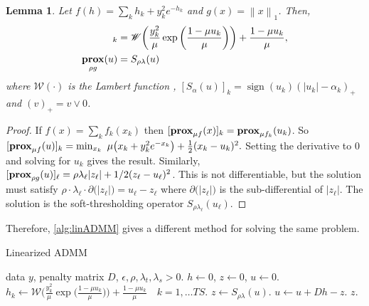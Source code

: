 \documentclass{article}
\newtheorem{lemma}[theorem]{Lemma}
\newcommand{\norm}[1]{\left\lVert #1 \right\rVert}
\DeclareMathOperator*{\prox}{\bf prox}
\DeclareMathOperator*{\sign}{sign}
\begin{document}
\begin{lemma}
  Let $f(h) = \sum_{k} h_{k} + y_{k}^2e^{-h_{k}}$ and $g(x) =
  \norm{x}_1$. Then, 
  \begin{align}
    [\prox_{\mu f}(u)]_k &= \mathscr{W}\bigg(\frac{y_k^2}{\mu}
    \exp\bigg(\frac{1-\mu u_k}{\mu}\bigg) \bigg) + \frac{1-\mu u_k}{\mu},\\
    \prox_{\rho g}(u) &= S_{\rho\lambda}(u)
  \end{align}
where $\mathscr{W}(\cdot)$ is the \textit{Lambert function} \cite{corless_lambertw_1996},  $[S_{\alpha}(u)]_k = \sign(u_k)(|u_k| -\alpha_k)_+$ and
$(v)_+=v\vee 0$.
\end{lemma}
\begin{proof}
  If $f(x)=\sum_k f_k(x_k)$ then $[\prox_{\mu f}(x)]_k =
  \prox_{\mu f_k}(u_k)$. So 
  $[\prox_{\mu f}(u)]_k=\min_{x_k} \,\,
  \mu\big(x_k+y_{k}^2e^{-x_{k}}\big)+\frac{1}{2}  (x_k-u_k)^2.$
  Setting the derivative to 0 and solving for $u_k$ gives the
  result. Similarly, $[\prox_{\rho g}(u)]_\ell=\rho
  \lambda_\ell |z_\ell|+1/2(z_\ell-u_\ell)^2$. This is not differentiable,
  but the solution must satisfy $\rho \cdot \lambda_\ell \cdot \partial
  \big(|z_\ell| \big)=u_\ell-z_\ell$ where $\partial \big(|z_\ell| \big)$ is the
  sub-differential of $|z_\ell|$. The solution is the soft-thresholding
  operator $S_{\rho\lambda_\ell}(u_\ell)$.
\end{proof}

Therefore, \autoref{alg:linADMM} gives a different method for solving
the same problem.

\begin{algorithm}[tb]
  \caption{Linearized ADMM }
  \label{alg:linADMM}
  \begin{algorithmic}
     data $y$, penalty matrix $D$, 
    $\epsilon, \rho,\lambda_t,\lambda_s >0$.
     $h\leftarrow 0$, $z\leftarrow 0$, $u\leftarrow
    0$.  
    \REPEAT
    \STATE $h_k\leftarrow \mathscr{W}\bigg(\frac{y_k^2}{\mu} 
    \exp\bigg(\frac{1-\mu u_k}{\mu}\bigg) \bigg) + \frac{1-\mu
      u_k}{\mu}\quad k=1,\ldots TS$. 
    \STATE $z\leftarrow S_{\rho\lambda}(u)$. 
    \STATE $u\leftarrow u + Dh-z$. 
    \UNTIL {$\max\{\norm{h-z}_2^2,\; \norm{z^{m+1}-z^m}_2^2\} < epsilon$}
     $z$.
  \end{algorithmic}
\end{algorithm}
\end{document}
